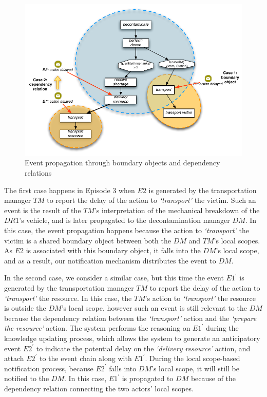 \begin{figure}[htbp] %
	\centering
	\includegraphics[width=5.8in]{two_cases_in_event_proagation.pdf} 
	\caption{Event propagation through boundary objects and dependency relations}
	\label{fig:two_cases_in_event_proagation}
\end{figure}

The first case happens in Episode 3 when $E2$ is generated by the transportation manager $TM$ to report the delay of the action to \emph{`transport'} the victim. Such an event is the result of the $TM$'s interpretation of the mechanical breakdown of the $DR1$'s vehicle, and is later propagated to the decontamination manager $DM$. In this case, the event propagation happens because the action to \emph{`transport'} the victim is a shared boundary object between both the $DM$ and $TM$'s local scopes. As $E2$ is associated with this boundary object, it falls into the $DM$'s local scope, and as a result, our notification mechanism distributes the event to $DM$.

In the second case, we consider a similar case, but this time the event $E1^\prime$ is generated by the transportation manager $TM$ to report the delay of the action to \emph{`transport'} the resource. In this case, the $TM$'s action to \emph{`transport'} the resource is outside the $DM$'s local scope, however such an event is still relevant to the $DM$ because the dependency relation between the \emph{`transport'} action and the \emph{`prepare the resource'} action. The system performs the reasoning on $E1^\prime$ during the knowledge updating process, which allows the system to generate an anticipatory event $E2^\prime$ to indicate the potential delay on the \emph{`delivery resource'} action, and attach $E2^\prime$ to the event chain along with $E1^\prime$. During the local scope-based notification process, because $E2^\prime$ falls into $DM$'s local scope, it will still be notified to the $DM$. In this case, $E1^\prime$ is propagated to $DM$ because of the dependency relation connecting the two actors' local scopes.

